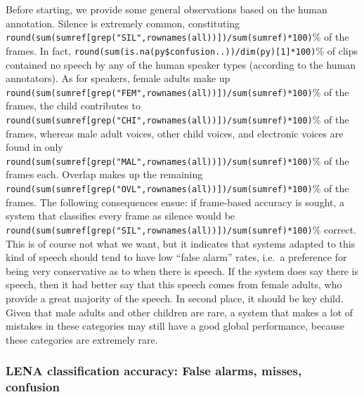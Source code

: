 \documentclass[english,floatsintext,man]{apa6}
\begin{document}
Before starting, we provide some general observations based on the human
annotation. Silence is extremely common, constituting
\texttt{round(sum(sumref{[}grep("SIL",rownames(all)){]})/sum(sumref)*100)}\%
of the frames. In fact,
\texttt{round(sum(is.na(py\$confusion..))/dim(py){[}1{]}*100)}\% of
clips contained no speech by any of the human speaker types (according
to the human annotators). As for speakers, female adults make up
\texttt{round(sum(sumref{[}grep("FEM",rownames(all)){]})/sum(sumref)*100)}\%
of the frames, the child contributes to
\texttt{round(sum(sumref{[}grep("CHI",rownames(all)){]})/sum(sumref)*100)}\%
of the frames, whereas male adult voices, other child voices, and
electronic voices are found in only
\texttt{round(sum(sumref{[}grep("MAL",rownames(all)){]})/sum(sumref)*100)}\%
of the frames each. Overlap makes up the remaining
\texttt{round(sum(sumref{[}grep("OVL",rownames(all)){]})/sum(sumref)*100)}\%
of the frames. The following consequences ensue: if frame-based accuracy
is sought, a system that classifies every frame as silence would be
\texttt{round(sum(sumref{[}grep("SIL",rownames(all)){]})/sum(sumref)*100)}\%
correct. This is of course not what we want, but it indicates that
systems adapted to this kind of speech should tend to have low
\enquote{false alarm} rates, i.e.~a preference for being very
conservative as to when there is speech. If the system does say there is
speech, then it had better say that this speech comes from female
adults, who provide a great majority of the speech. In second place, it
should be key child. Given that male adults and other children are rare,
a system that makes a lot of mistakes in these categories may still have
a good global performance, because these categories are extremely rare.

\subsubsection{LENA classification accuracy: False alarms, misses,
confusion}\label{lena-classification-accuracy-false-alarms-misses-confusion}
\end{document}
